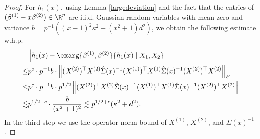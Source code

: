 \documentclass[aos,preprint]{imsart}
\begin{document}
\begin{proof}
For $h_1(x)$, using Lemma \ref{largedeviation} and the fact that the entries of $(\beta^{(1)}-x\beta^{(2)})\in \R^p$ are i.i.d. Gaussian random variables with mean zero and variance $b = p^{-1}((x-1)^2\kappa^2 + (x^2+1)d^2)$, we obtain the following estimate w.h.p.
\begin{align}
	&\left|h_1(x) - \exarg{\beta^{(1)},\beta^{(2)}}{h_1(x) \mid X_1, X_2}\right|\nonumber \\
\le& p^{c}\cdot p^{-1} b \cdot \left\| (X^{(2)})^\top X^{(2)}  \hat\Sigma(x)^{-1}  (X^{(1)})^\top X^{(1)} \hat\Sigma(x)^{-1} (X^{(2)})^\top X^{(2)} \right\|_F \nonumber\\
	\le& p^{c}\cdot p^{-1} b \cdot p^{1/2} \left\| (X^{(2)})^\top X^{(2)}  \hat\Sigma(x)^{-1}  (X^{(1)})^\top X^{(1)} \hat\Sigma(x)^{-1} (X^{(2)})^\top X^{(2)} \right\| \nonumber \\
	\lesssim& p^{1/2+c}\cdot \frac{b}{(x^2+1)^2}\lesssim p^{1/2+c}(\kappa^2 + d^2).\label{eq_hA1}
\end{align}
In the third step we use the operator norm bound of $X^{(1)}$, $X^{(2)}$, and $\hat{\Sigma}(x)^{-1}$. %


\end{proof}
\end{document}
